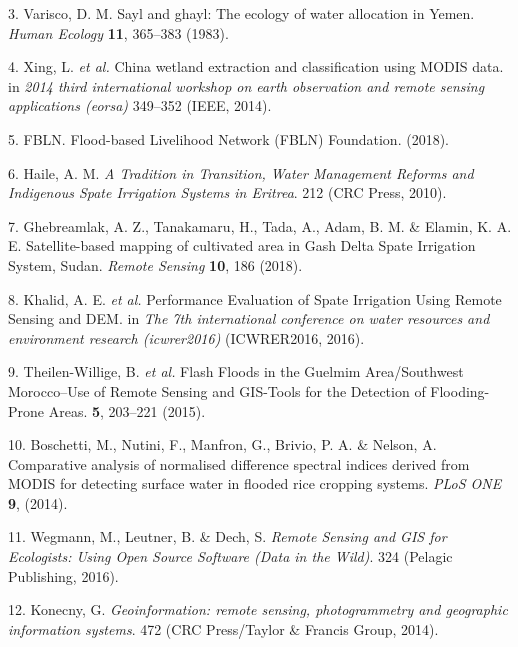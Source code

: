 \documentclass[12pt,oneside]{article}
\begin{document}
\leavevmode\hypertarget{ref-Varisco_1983}{}%
3. Varisco, D. M. Sayl and ghayl: The ecology of water allocation in Yemen. \emph{Human Ecology} \textbf{11}, 365--383 (1983).

\leavevmode\hypertarget{ref-Xing_et_al_2014}{}%
4. Xing, L. \emph{et al.} China wetland extraction and classification using MODIS data. in \emph{2014 third international workshop on earth observation and remote sensing applications (eorsa)} 349--352 (IEEE, 2014).

\leavevmode\hypertarget{ref-FBLN_2018}{}%
5. FBLN. Flood-based Livelihood Network (FBLN) Foundation. (2018).

\leavevmode\hypertarget{ref-Haile_2010}{}%
6. Haile, A. M. \emph{A Tradition in Transition, Water Management Reforms and Indigenous Spate Irrigation Systems in Eritrea}. 212 (CRC Press, 2010).

\leavevmode\hypertarget{ref-Ghebreamlak_et_al_2018}{}%
7. Ghebreamlak, A. Z., Tanakamaru, H., Tada, A., Adam, B. M. \& Elamin, K. A. E. Satellite-based mapping of cultivated area in Gash Delta Spate Irrigation System, Sudan. \emph{Remote Sensing} \textbf{10}, 186 (2018).

\leavevmode\hypertarget{ref-Khalid_et_al_2016}{}%
8. Khalid, A. E. \emph{et al.} Performance Evaluation of Spate Irrigation Using Remote Sensing and DEM. in \emph{The 7th international conference on water resources and environment research (icwrer2016)} (ICWRER2016, 2016).

\leavevmode\hypertarget{ref-Theilen-Willige_et_al_2015}{}%
9. Theilen-Willige, B. \emph{et al.} Flash Floods in the Guelmim Area/Southwest Morocco--Use of Remote Sensing and GIS-Tools for the Detection of Flooding-Prone Areas. \textbf{5}, 203--221 (2015).

\leavevmode\hypertarget{ref-Boschetti_et_al_2014}{}%
10. Boschetti, M., Nutini, F., Manfron, G., Brivio, P. A. \& Nelson, A. Comparative analysis of normalised difference spectral indices derived from MODIS for detecting surface water in flooded rice cropping systems. \emph{PLoS ONE} \textbf{9}, (2014).

\leavevmode\hypertarget{ref-Wegmann_et_al_2016}{}%
11. Wegmann, M., Leutner, B. \& Dech, S. \emph{Remote Sensing and GIS for Ecologists: Using Open Source Software (Data in the Wild)}. 324 (Pelagic Publishing, 2016).

\leavevmode\hypertarget{ref-Konecny_2014}{}%
12. Konecny, G. \emph{Geoinformation: remote sensing, photogrammetry and geographic information systems}. 472 (CRC Press/Taylor \& Francis Group, 2014).
\end{document}
